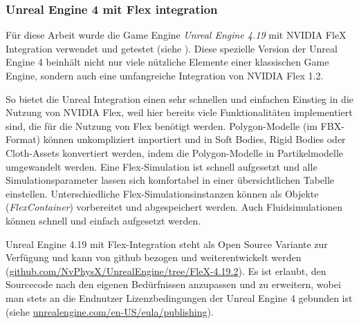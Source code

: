 


\subsubsection{Unreal Engine 4 mit Flex integration}

Für diese Arbeit wurde die Game Engine \textit{Unreal Engine 4.19} mit NVIDIA FleX Integration verwendet und getestet (siehe \cite{UE4FlexDoc}). Diese spezielle Version der Unreal Engine 4 beinhält nicht nur viele nützliche Elemente einer klassischen Game Engine, sondern auch eine umfangreiche Integration von NVIDIA Flex 1.2. 

So bietet die Unreal Integration einen sehr schnellen und einfachen Einstieg in die Nutzung von NVIDIA Flex, weil hier bereits viele Funktionalitäten implementiert sind, die für die Nutzung von Flex benötigt werden. Polygon-Modelle (im FBX-Format) können unkompliziert importiert und in Soft Bodies, Rigid Bodies oder Cloth-Assets konvertiert werden, indem die Polygon-Modelle in Partikelmodelle umgewandelt werden. Eine Flex-Simulation ist schnell aufgesetzt und alle Simulationsparameter lassen sich komfortabel in einer übersichtlichen Tabelle einstellen. Unterschiedliche Flex-Simulationsinstanzen können als Objekte (\textit{FlexContainer}) vorbereitet und abgespeichert werden. Auch Fluidsimulationen können schnell und einfach aufgesetzt werden.

Unreal Engine 4.19 mit Flex-Integration steht als Open Source Variante zur Verfügung und kann von github bezogen und weiterentwickelt werden (\url{github.com/NvPhysX/UnrealEngine/tree/FleX-4.19.2}). Es ist erlaubt, den Sourcecode nach den eigenen Bedürfnissen anzupassen und zu erweitern, wobei man stets an die Endnutzer Lizenzbedingungen der Unreal Engine 4 gebunden ist (siehe \url{unrealengine.com/en-US/eula/publishing}).

